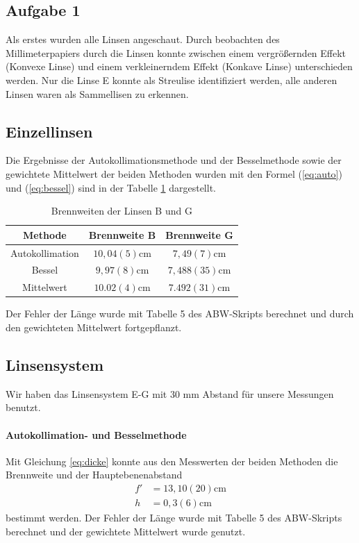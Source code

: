 \documentclass[11pt, a4paper]{article}
\begin{document}
    \subsection{Aufgabe 1}
    Als erstes wurden alle Linsen angeschaut. Durch beobachten des Millimeterpapiers durch die Linsen konnte zwischen einem vergrößernden Effekt (Konvexe Linse) und einem verkleinerndem Effekt (Konkave Linse) unterschieden werden. Nur die Linse E konnte als Streulise identifiziert werden, alle anderen Linsen waren als Sammellisen zu erkennen.

    \subsection{Einzellinsen}
    Die Ergebnisse der Autokollimationsmethode und der Besselmethode sowie der gewichtete Mittelwert der beiden Methoden wurden mit den Formel (\ref{eq:auto}) und (\ref{eq:bessel}) sind in der Tabelle \ref{tab:ergebnisse} dargestellt.

    \begin{table}[h]
        \centering
        \begin{tabular}{c|c|c}
            Methode & Brennweite B & Brennweite G \\ \hline
            Autokollimation & $10,04(5) \si{\centi\metre}$ & $7,49(7) \si{\centi\metre}$ \\ \hline
            Bessel & $9,97(8) \si{\centi\metre}$ & $7,488(35) \si{\centi\metre}$ \\ \hline
            Mittelwert & $10.02(4) \si{\centi\metre}$ & $7.492(31) \si{\centi\metre}$
        \end{tabular}
        \caption{Brennweiten der Linsen B und G}
        \label{tab:ergebnisse}
    \end{table}
    Der Fehler der Länge wurde mit Tabelle 5 des ABW-Skripts \cite{ABW} berechnet und durch den gewichteten Mittelwert fortgepflanzt.

    \subsection{Linsensystem}
    Wir haben das Linsensystem E-G mit $30$ mm Abstand für unsere Messungen benutzt.

    \paragraph{Autokollimation- und Besselmethode}
    Mit Gleichung \ref{eq:dicke} konnte aus den Messwerten der beiden Methoden die Brennweite und der Hauptebenenabstand
    \begin{align}
        f' &= 13,10(20) \si{\centi\metre} \\
        h &= 0,3(6) \si{\centi\metre}
    \end{align}
    bestimmt werden. Der Fehler der Länge wurde mit Tabelle 5 des ABW-Skripts \cite{ABW} berechnet und der gewichtete Mittelwert wurde genutzt.
\end{document}
